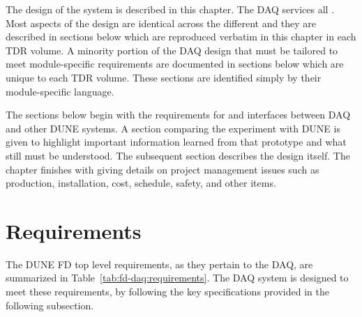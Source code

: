 The design of the    system is described in this chapter.  The DAQ services all  .  Most  aspects of the design are identical across the different  and they are described in sections below which are reproduced verbatim in this  chapter in each  TDR volume.  A minority portion of the DAQ design that must be tailored to meet module-specific requirements are documented in sections below which are unique to each  TDR volume.  These sections are identified simply by their module-specific language.

The sections below begin with the requirements for and interfaces between DAQ and other DUNE systems.  A section comparing the  experiment with DUNE is given to highlight important information learned from that prototype and what still must be understood.  The subsequent section describes the design itself.  The chapter finishes with giving details on project management issues such as production, installation, cost, schedule, safety, and other items.

\section{Requirements}
\label{sec:fd-daq:requirements}


The DUNE FD top level requirements, as they pertain to the DAQ, are
summarized in Table~\ref{tab:fd-daq:requirements}. The DAQ system is
designed to meet these requirements, by following the key
specifications provided in the following subsection.


